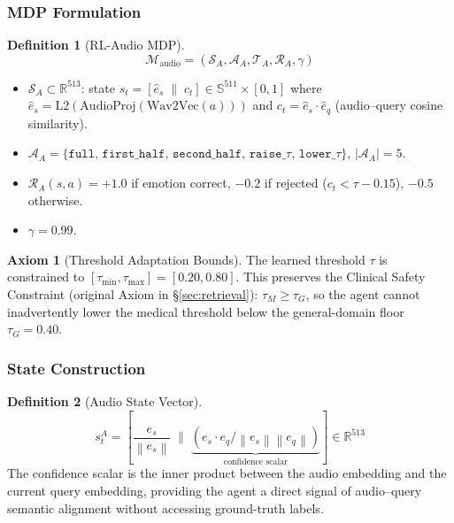\documentclass[12pt,a4paper]{article}
\theoremstyle{definition}
\newtheorem{definition}{Definition}[section]
\newtheorem{axiom}{Axiom}[section]
\theoremstyle{plain}
\theoremstyle{remark}
\newcommand{\R}{\mathbb{R}}
\newcommand{\Sph}{\mathbb{S}}
\newcommand{\Norm}[1]{\left\|#1\right\|}
\begin{document}
\subsubsection{MDP Formulation}

\begin{definition}[RL-Audio MDP]
\label{def:rl_audio_mdp}
\[
  \mathcal{M}_{\text{audio}} = (\mathcal{S}_A,\mathcal{A}_A,\mathcal{T}_A,\mathcal{R}_A,\gamma)
\]
\begin{itemize}[nosep]
  \item $\mathcal{S}_A \subset \R^{513}$:
        state $s_t = [\hat{e}_s \;\|\; c_t] \in \Sph^{511}\times[0,1]$
        where $\hat{e}_s = \mathrm{L2}(\text{AudioProj}(\text{Wav2Vec}(a)))$
        and $c_t = \hat{e}_s \cdot \hat{e}_q$ (audio--query cosine similarity).
  \item $\mathcal{A}_A = \{\texttt{full},\,\texttt{first\_half},\,
        \texttt{second\_half},\,\texttt{raise\_}\tau,\,\texttt{lower\_}\tau\}$,
        $|\mathcal{A}_A|=5$.
  \item $\mathcal{R}_A(s,a) = +1.0$ if emotion correct,
        $-0.2$ if rejected ($c_t < \tau - 0.15$),
        $-0.5$ otherwise.
  \item $\gamma = 0.99$.
\end{itemize}
\end{definition}

\begin{axiom}[Threshold Adaptation Bounds]
\label{ax:tau_bounds}
The learned threshold $\tau$ is constrained to $[\tau_{\min},\tau_{\max}]=[0.20,0.80]$.
This preserves the Clinical Safety Constraint (original Axiom in \S\ref{sec:retrieval}):
$\tau_M \ge \tau_G$, so the agent cannot inadvertently lower the medical threshold
below the general-domain floor $\tau_G=0.40$.
\end{axiom}

\subsubsection{State Construction}

\begin{definition}[Audio State Vector]
\[
  s_t^A = \left[\frac{e_s}{\Norm{e_s}}\;\Bigg\|\;
  \underbrace{(e_s \cdot e_q / \Norm{e_s}\Norm{e_q})}_{\text{confidence scalar}}\right]
  \in \R^{513}
\]
The confidence scalar is the inner product between the audio embedding and the
current query embedding, providing the agent a direct signal of audio--query
semantic alignment without accessing ground-truth labels.
\end{definition}
\end{document}
